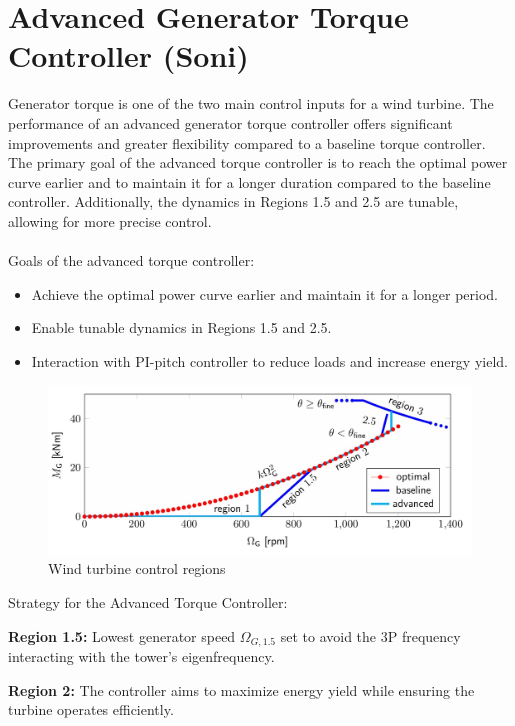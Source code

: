 \section{Advanced Generator Torque Controller (Soni)} \label{Torque controller}
Generator torque is one of the two main control inputs for a wind turbine.
The performance of an advanced generator torque controller offers significant improvements and greater flexibility compared to a baseline torque controller.
The primary goal of the advanced torque controller is to reach the optimal power curve earlier and to maintain it for a longer duration compared to the baseline controller.
Additionally, the dynamics in Regions 1.5 and 2.5 are tunable, allowing for more precise control.
\\
\\
Goals of the advanced torque controller:
\begin{itemize}
	\item Achieve the optimal power curve earlier and maintain it for a longer period.
	\item Enable tunable dynamics in Regions 1.5 and 2.5.
	\item Interaction with PI-pitch controller to reduce loads and increase energy yield.
\end{itemize}

\begin{figure}[htbp]
	\centering
	\includegraphics[width=\textwidth]{Figures/Figure_3.jpg}
	\caption{Wind turbine control regions \cite{SchlipfLecture}} 
	\label{WT control region}
\end{figure}

Strategy for the Advanced Torque Controller:

\textbf{Region 1.5:} Lowest generator speed $\Omega_{G,1.5}$ set to avoid the 3P frequency interacting with the tower's eigenfrequency.

\textbf{Region 2:} The controller aims to maximize energy yield while ensuring the turbine operates efficiently.

